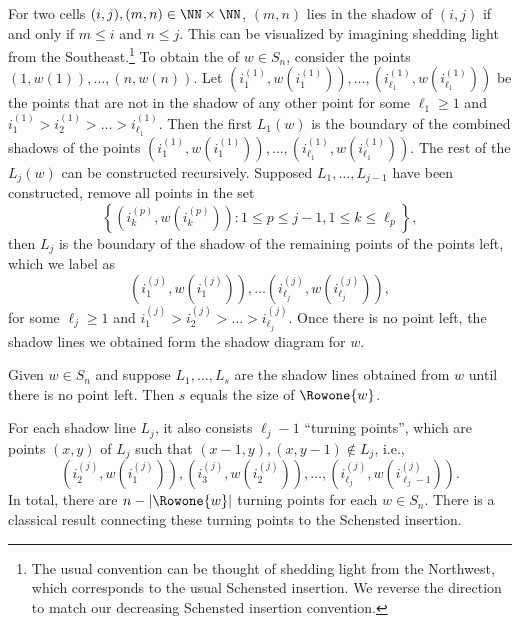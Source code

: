 For two cells $(i,j), (m,n) \in \NN\times \NN$, 
$(m,n)$ lies in the shadow of $(i,j)$ if and only if $m \leq i$ and $n \leq j$. This can be visualized by imagining shedding light from the Southeast.\footnote{The usual convention can be thought of shedding light from the Northwest, which corresponds to the usual Schensted insertion. We reverse the direction to match our decreasing Schensted insertion convention.}
To obtain the  of $w\in S_n$, consider the points $(1,w(1)),\dots, (n,w(n))$. Let $\left(i^{(1)}_1,w(i^{(1)}_1)\right),\dots,\left(i^{(1)}_{\ell_{1}},w(i^{(1)}_{\ell_1})\right)$ be the points that are not in the shadow of any other point for some $\ell_1 \geqslant 1$ and $i^{(1)}_1> i^{(1)}_2>\dots > i^{(1)}_{\ell_1}$. Then the first  $L_1(w)$ is the boundary of the combined shadows of the points $\left(i^{(1)}_1,w(i^{(1)}_1)\right),\dots,\left(i^{(1)}_{\ell_1},w(i^{(1)}_{\ell_1})\right)$. The rest of the $L_j(w)$ can be constructed recursively. Supposed $L_1,\dots,L_{j-1}$ have been constructed, remove all points in the set $$\left\{ \left(i^{(p)}_{k},w(i^{(p)}_k)\right): 1\leqslant p \leqslant j-1, 1\leqslant k \leqslant \ell_p \right\},$$ then $L_j$ is the boundary of the shadow of the remaining points of the points left, which we label as 
\[
\left(i^{(j)}_1,w(i^{(j)}_1)\right),\dots \left(i^{(j)}_{\ell_j},w(i^{(j)}_{\ell_j})\right),
\]
for some $\ell_j \geqslant 1$ and $i^{(j)}_1>i^{(j)}_2>\dots>i^{(j)}_{\ell_j}$. Once there is no point left, the shadow lines we obtained form the shadow diagram for $w$.

\begin{ourthm}
Given $w\in S_n$ and suppose $L_1,\dots,L_s$ are the shadow lines obtained from $w$ until there is no point left. Then $s$ equals the size of $\Rowone{w}$.
\end{ourthm}

For each shadow line $L_j$, it also consists $\ell_{j}-1$ ``turning points'', which are points $(x,y)$ of $L_j$ such that $(x-1,y), (x,y-1)\notin L_j$, i.e.,
\[
\left(i^{(j)}_2,w(i^{(j)}_1)\right), \left(i^{(j)}_3,w(i^{(j)}_2)\right), \dots, \left(i^{(j)}_{\ell_j},w(i^{(j)}_{\ell_j-1})\right).
\]
In total, there are $n-|\Rowone{w}|$ turning points for each $w\in S_n$.
There is a classical result connecting
these turning points to the Schensted insertion. 

